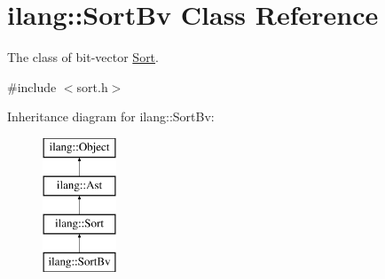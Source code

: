 \hypertarget{classilang_1_1_sort_bv}{}\section{ilang\+:\+:Sort\+Bv Class Reference}
\label{classilang_1_1_sort_bv}


The class of bit-\/vector \mbox{\hyperlink{classilang_1_1_sort}{Sort}}.  




{\ttfamily \#include $<$sort.\+h$>$}

Inheritance diagram for ilang\+:\+:Sort\+Bv\+:\begin{figure}[H]
\begin{center}
\leavevmode
\includegraphics[height=4.000000cm]{classilang_1_1_sort_bv}
\end{center}
\end{figure}
